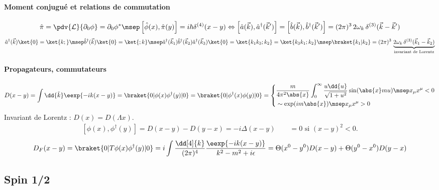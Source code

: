 \documentclass{article}
\begin{document}
\paragraph{Moment conjugué et relations de commutation}
\begin{align*}
\hat{\pi} = \pdv{\mathcal{L}}{\partial_0\phi}=\partial_0\phi^*
\msep
\left[ \hat{\phi}(x), \hat{\pi}(y) \right] = i\hbar\delta^{(4)}(x-y)
\Leftrightarrow
\left[ \hat{a}(\vec{k}), \hat{a}^\dagger(\vec{k}') \right] =
\left[ \hat{b}(\vec{k}), \hat{b}^\dagger(\vec{k}') \right] =
(2\pi)^3\,2\omega_k\,\delta^{(3)}(\vec{k}-\vec{k}')
\end{align*}
\begin{align*}
\hat{a}^\dagger(\vec{k})\ket{0} = \ket{k;}
\msep
\hat{b}^\dagger(\vec{k})\ket{0} = \ket{;k}
\msep
\hat{a}^\dagger(\vec{k}_1)\hat{b}^\dagger(\vec{k}_2)\hat{a}^\dagger(\vec{k}_3)\ket{0} = \ket{k_1k_3;k_2}= \ket{k_3k_1;k_2}
\msep
\braket{k_1|k_2} = (2\pi)^3\,\underbrace{2\omega_k\,\delta^{(3)}(\vec{k}_1-\vec{k}_2)}_\text{invariant de Lorentz}
\end{align*}

\paragraph{Propagateurs, commutateurs}
\begin{align*}
D(x-y) = \int\dd{\tilde{k}}\eexp{-ik(x-y)} = \braket{0|\phi(x)\phi^\dagger(y)|0} = \braket{0|\phi^\dagger(x)\phi(y)|0}
=
\left\lbrace
\begin{aligned}
& \frac{m}{4\pi^2\abs{x}} \int_0^\infty \frac{u\dd{u}}{\sqrt{1+u^2}}\sin(\abs{x}mu)\msep x_\mu x^\mu < 0\\
& \sim \exp(im\abs{x})\msep x_\mu x^\mu > 0
\end{aligned}
\right.
\end{align*}
Invariant de Lorentz : $D(x) = D(\Lambda x)$.
\begin{align*}
\left[ \phi(x), \phi^\dagger(y) \right] = D(x-y) - D(y-x) = -i \Delta(x-y) \qquad =0 \text{ si } (x-y)^2<0.
\end{align*}
\begin{align*}
D_F(x-y) = \braket{0|T\phi(x)\phi^\dagger(y)|0} = i \int \frac{\dd[4]{k}}{(2\pi)^4}\frac{\eexp{-ik(x-y)}}{k^2-m^2+i\epsilon}
= \Theta(x^0-y^0)D(x-y) + \Theta(y^0-x^0)D(y-x)
\end{align*}

\subsection{Spin 1/2}
\end{document}
